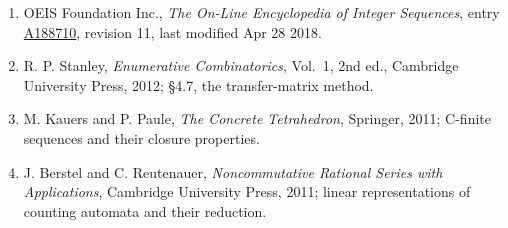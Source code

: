 \documentclass[11pt]{article}
\theoremstyle{definition}
\begin{document}
\begin{enumerate}

\item OEIS Foundation Inc., \emph{The On-Line Encyclopedia of Integer Sequences}, entry \href{https://oeis.org/A188710}{A188710}, revision 11, last modified Apr 28 2018.

\item R. P. Stanley, \emph{Enumerative Combinatorics}, Vol.~1, 2nd ed., Cambridge University Press, 2012; \S4.7, the transfer-matrix method.

\item M. Kauers and P. Paule, \emph{The Concrete Tetrahedron}, Springer, 2011; C-finite sequences and their closure properties.

\item J. Berstel and C. Reutenauer, \emph{Noncommutative Rational Series with Applications}, Cambridge University Press, 2011; linear representations of counting automata and their reduction.

\end{enumerate}
\end{document}
